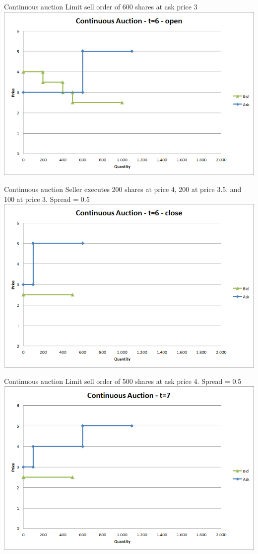 \begin{frame}{Continuous auction}
	Limit sell order of 600 shares at ask price 3
	\quad
	\center
	\includegraphics[width=.75\linewidth]{pics/Continuous_t6open}
\end{frame}


\begin{frame}{Continuous auction}
	Seller executes 200 shares at price 4, 200 at price 3.5, and 100 at price 3. Spread = 0.5
	\center
	\includegraphics[width=.75\linewidth]{pics/Continuous_t6close}
\end{frame}


\begin{frame}{Continuous auction}
	Limit sell order of 500 shares at ask price 4. Spread = 0.5
	\center
	\includegraphics[width=.75\linewidth]{pics/Continuous_t7}
\end{frame}



